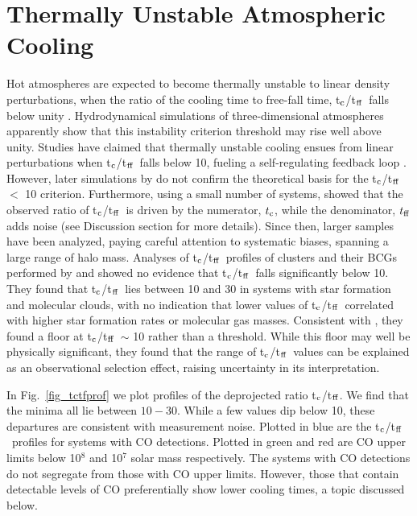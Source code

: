 \documentclass[iop]{emulateapj}
\newcommand{\tctff}{{t$_{\rm c}$/t$_{\rm ff}$}}
\begin{document}
\section{Thermally Unstable Atmospheric Cooling}\label{sec:4}
Hot atmospheres are expected to become thermally unstable to linear density perturbations, when the ratio of the cooling time to free-fall time, \tctff\, falls below unity \citep{Nulsen:86, Pizzolato:05, McCourt:12}. Hydrodynamical simulations of three-dimensional atmospheres apparently show that this instability criterion threshold may rise well above unity.  Studies have claimed that thermally unstable cooling ensues from linear perturbations when \tctff\ falls below 10, fueling a self-regulating feedback loop \citep{Sharma:12, McCourt:12, Gaspari:13, Li:15}. However, later simulations by \citet{Sharma:16} do not confirm the theoretical basis for the \tctff\ $<$ 10 criterion. Furthermore, using a small number of systems, \citet{McNamara:16} showed that the observed ratio of \tctff\ is driven by the numerator, $t_{\rm c}$, while the denominator, $t_{\rm ff}$ adds noise (see Discussion section for more details). Since then, larger samples have been analyzed, paying careful attention to systematic biases, spanning a large range of halo mass.  Analyses of \tctff\  profiles of clusters and their BCGs performed by \citet{Hogan:17a} and \citet{Pulido:17} showed no evidence that \tctff\ falls significantly below 10.  They found  that \tctff\ lies between 10 and 30 in systems with star formation and molecular clouds, with no indication that lower values of \tctff\ correlated with higher star formation rates or molecular gas masses.  Consistent with \citet{Voit:15, Voit:19}, they found a floor at \tctff\ $\sim$ 10 rather than a threshold.  While this floor may well be physically significant, they found that the range of \tctff\ values can be explained as an observational selection effect, raising uncertainty in its interpretation.

In Fig.~\ref{fig_tctfprof} we plot profiles of the deprojected ratio \tctff. We find that the minima all lie between $10-30$.  While a few values dip below 10, these departures are consistent with measurement noise. Plotted in blue are the \tctff\ profiles for systems with CO detections. Plotted in green and red are CO upper limits below 10$^8$ and 10$^7$ solar mass respectively. The systems with CO detections do not segregate from those with CO upper limits. However, those that contain detectable levels of CO preferentially show lower cooling times, a topic discussed below. 
\end{document}
